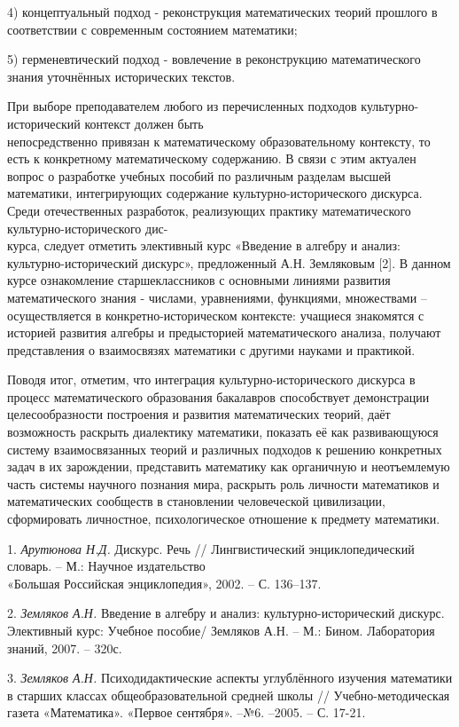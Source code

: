 4) концептуальный подход - реконструкция математических теорий прошлого в соответствии с современным состоянием математики;

5) герменевтический подход - вовлечение в реконструкцию математического знания уточнённых исторических текстов.

При выборе преподавателем любого из перечисленных подходов культурно-исторический контекст должен быть \\не\-посредственно привязан к математическому образовате\-льному контексту, то есть к конкретному математическому содержанию. В связи с этим актуален вопрос о разработке учебных пособий по различным разделам высшей математики, интегрирующих содержание культурно-исторического дискурса. Среди отечественных разработок, реализующих практику математического культурно-исторического дис-\\курса, следует отметить элективный курс «Введение в алгебру и анализ: культурно-исторический дискурс», предложенный А.Н. Земляковым [2]. В данном курсе ознакомление старшеклассников с основными линиями развития математического знания - числами, уравнениями, функциями, множествами – осуществляется в конкретно-историческом контексте: учащиеся знакомятся с историей развития алгебры и предысторией математического анализа, получают представления о взаимосвязях математики с другими науками и практикой.

Поводя итог, отметим, что интеграция культурно-исто\-ри\-ческого дискурса в процесс математического образования бакалавров способствует демонстрации целесообразности построения и развития математических теорий, даёт возможность раскрыть диалектику математики, показать её как развивающуюся систему взаимосвязанных теорий и различных подходов к решению конкретных задач в их зарождении, представить математику как органичную и неотъемлемую часть системы научного познания мира, раскрыть роль личности математиков и математических сообществ в становлении человеческой цивилизации, сформировать личностное, психологическое отношение к предмету математики.



\litlist


1. {\it Арутюнова Н.Д.} Дискурс. Речь // Лингвистический энциклопедический словарь. – М.: Научное издательство \\«Большая Российская энциклопедия», 2002. – С. 136–137.

2. {\it Земляков А.Н.} Введение в алгебру и анализ: культур\-но-исторический дискурс. Элективный курс: Учебное пособие/ Земляков А.Н. – М.: Бином. Лаборатория знаний, 2007. – 320с.

3. {\it Земляков А.Н.} Психодидактические аспекты углублённого изучения математики в старших классах общеобразовательной средней школы // Учебно-методическая газета «Математика». «Первое сентября». –№6. –2005. – С. 17-21.
